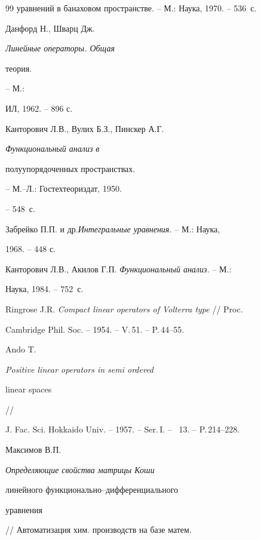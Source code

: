 \begin{thebibliography}{99}
{уравнений в банаховом пространстве.} -- М.: Наука, 1970. -- 536~с.







Данфорд Н., Шварц Дж. {\em Линейные операторы. Общая


теория.} -- М.:


ИЛ, 1962. -- 896 с.







Канторович Л.В., Вулих Б.З., Пинскер А.Г. {\em Функциональный анализ в


полуупорядоченных пространствах.} -- М.--Л.: Гостехтеориздат, 1950.


-- 548~с.







Забрейко П.П. и др.{\em Интегральные уравнения.} -- М.: Наука,


1968. -- 448 с.







Канторович Л.В., Акилов Г.П. {\em Функциональный анализ.} -- М.:


Наука, 1984. -- 752~с.







Ringrose J.R. {\em Compact linear operators of Volterra type} // Proc.


Cambridge Phil. Soc. -- 1954. -- V.\,51. -- P.\,44--55.







Ando T. {\em Positive linear operators in semi ordered


linear spaces} //


J. Fac. Sci. Hokkaido Univ. -- 1957. -- Ser.\,I. -- \No\, 13. -- P.\,214--228.







Максимов В.П. {\em Определяющие свойства матрицы Коши


линейного функционально--дифференциального


уравнения} // Автоматизация хим. производств на базе матем.



\end{thebibliography}
